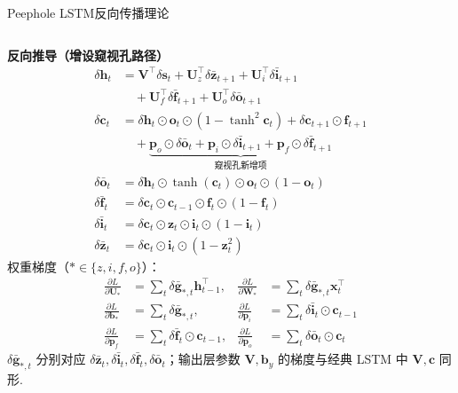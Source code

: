 \documentclass{模版}
\begin{document}
\begin{frame}{Peephole LSTM反向传播理论}
\begin{columns}[T,onlytextwidth]
  \vspace{3em}
  \textbf{反向推导（增设窥视孔路径）}
  \begin{align*}
    \delta\symbf{h}_t &= \symbf{V}^{\top}\delta\symbf{s}_t
      +\symbf{U}_z^{\top}\delta\bar{\symbf{z}}_{t+1}
      +\symbf{U}_i^{\top}\delta\bar{\symbf{i}}_{t+1}\\
    &\quad +\symbf{U}_f^{\top}\delta\bar{\symbf{f}}_{t+1}
      +\symbf{U}_o^{\top}\delta\bar{\symbf{o}}_{t+1}\\
    \delta\symbf{c}_t &= \delta\symbf{h}_t\odot\symbf{o}_t\odot(1-\tanh^2\!\symbf{c}_t)
      +\delta\symbf{c}_{t+1}\odot\symbf{f}_{t+1}\\
    &\quad +\underbrace{\symbf{p}_o\odot\delta\bar{\symbf{o}}_t
      +\symbf{p}_i\odot\delta\bar{\symbf{i}}_{t+1}
      +\symbf{p}_f\odot\delta\bar{\symbf{f}}_{t+1}}_{\text{窥视孔新增项}}\\
    \delta\bar{\symbf{o}}_t &= \delta\symbf{h}_t\odot\tanh(\symbf{c}_t)\odot\symbf{o}_t\odot(1-\symbf{o}_t)\\
    \delta\bar{\symbf{f}}_t &= \delta\symbf{c}_t\odot\symbf{c}_{t-1}\odot\symbf{f}_t\odot(1-\symbf{f}_t)\\
    \delta\bar{\symbf{i}}_t &= \delta\symbf{c}_t\odot\symbf{z}_t\odot\symbf{i}_t\odot(1-\symbf{i}_t)\\
    \delta\bar{\symbf{z}}_t &= \delta\symbf{c}_t\odot\symbf{i}_t\odot(1-\symbf{z}_t^2)
  \end{align*}
  权重梯度（$*\in\{z,i,f,o\}$）：
  \begin{align*}
    \frac{\partial L}{\partial\symbf{U}_*}&=\textstyle\sum_t\delta\bar{\symbf{g}}_{*,t}\symbf{h}_{t-1}^{\top}, &
    \frac{\partial L}{\partial\symbf{W}_*}&=\textstyle\sum_t\delta\bar{\symbf{g}}_{*,t}\symbf{x}_t^{\top}\\
    \frac{\partial L}{\partial\symbf{b}_*}&=\textstyle\sum_t\delta\bar{\symbf{g}}_{*,t}, &
    \frac{\partial L}{\partial\symbf{p}_i}&=\textstyle\sum_t\delta\bar{\symbf{i}}_t\odot\symbf{c}_{t-1}\\
    \frac{\partial L}{\partial\symbf{p}_f}&=\textstyle\sum_t\delta\bar{\symbf{f}}_t\odot\symbf{c}_{t-1}, &
    \frac{\partial L}{\partial\symbf{p}_o}&=\textstyle\sum_t\delta\bar{\symbf{o}}_t\odot\symbf{c}_t
  \end{align*}
  \smallskip
  {\scriptsize $\delta\bar{\symbf{g}}_{*,t}$ 分别对应 $\delta\bar{\symbf{z}}_t,\delta\bar{\symbf{i}}_t,\delta\bar{\symbf{f}}_t,\delta\bar{\symbf{o}}_t$；输出层参数 $\symbf{V},\symbf{b}_{y}$ 的梯度与经典 LSTM 中 $\symbf{V},\symbf{c}$ 同形.}
\end{columns}
\end{frame}
\end{document}
